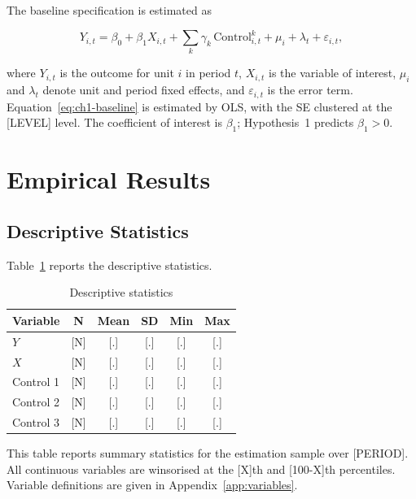 \documentclass[../main.tex]{subfiles}
\begin{document}
The baseline specification is estimated as

\begin{equation}\label{eq:ch1-baseline}
    Y_{i,t} = \beta_0 + \beta_1 X_{i,t}
              + \sum_{k} \gamma_k \, \text{Control}^{k}_{i,t}
              + \mu_i + \lambda_t + \varepsilon_{i,t},
\end{equation}

\noindent where $Y_{i,t}$ is the outcome for unit $i$ in period $t$,
$X_{i,t}$ is the variable of interest, $\mu_i$ and $\lambda_t$ denote
unit and period fixed effects, and $\varepsilon_{i,t}$ is the error
term. Equation~\eqref{eq:ch1-baseline} is estimated by \ac{OLS}, with the
\ac{SE} clustered at the [LEVEL] level. The
coefficient of interest is $\beta_1$; Hypothesis~1 predicts
$\beta_1 > 0$.

\section{Empirical Results}\label{sec:ch1-results}

\subsection{Descriptive Statistics}

Table~\ref{tab:ch1-descriptive} reports the descriptive statistics.

\begin{table}[htbp]
    \centering
    \caption{Descriptive statistics}
    \label{tab:ch1-descriptive}
    \begin{tabular}{lccccc}
        \toprule
        Variable & N & Mean & SD & Min & Max \\
        \midrule
        $Y$          & [N] & [.] & [.] & [.] & [.] \\
        $X$          & [N] & [.] & [.] & [.] & [.] \\
        Control 1    & [N] & [.] & [.] & [.] & [.] \\
        Control 2    & [N] & [.] & [.] & [.] & [.] \\
        Control 3    & [N] & [.] & [.] & [.] & [.] \\
        \bottomrule
    \end{tabular}

    \vspace{1mm}
    {\footnotesize
    This table reports summary statistics for the estimation sample over
    [PERIOD]. All continuous variables are winsorised at the
    [X]th and [100-X]th percentiles. Variable definitions are given in
    Appendix~\ref{app:variables}.
    }
\end{table}
\end{document}
